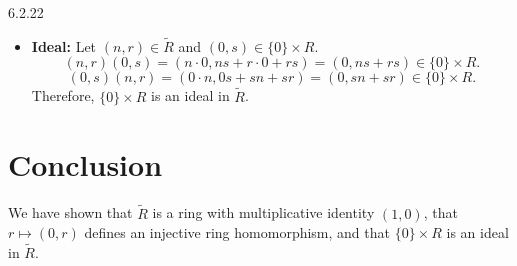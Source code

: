 \documentclass[12pt]{amsart}
\theoremstyle{definition}
\numberwithin{equation}{section}
\begin{document}
\begin{exercise}{6.2.22}
\begin{itemize}
        \item \textbf{Ideal:}
        Let \((n, r) \in \tilde{R}\) and \((0, s) \in \{0\} \times R\).
        \[
        (n, r)(0, s) = (n \cdot 0, n s + r \cdot 0 + r s) = (0, n s + r s) \in \{0\} \times R.
        \]
        \[
        (0, s)(n, r) = (0 \cdot n, 0 s + s n + s r) = (0, s n + s r) \in \{0\} \times R.
        \]
        Therefore, \( \{ 0\} \times R\) is an ideal in \(\tilde{R}\).
    \end{itemize}

    \section*{Conclusion}
    We have shown that \(\tilde{R}\) is a ring with multiplicative identity \((1, 0)\), that \(r \mapsto (0, r)\) defines an injective ring homomorphism, and that \( \{ 0\} \times R\) is an ideal in \(\tilde{R}\).

\end{exercise}
\newpage
\end{document}
